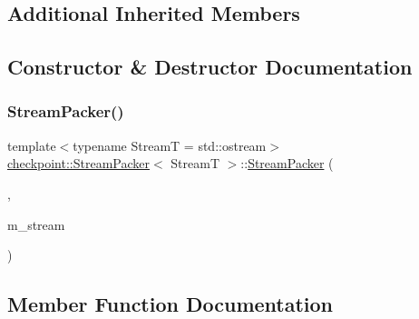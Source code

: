 \subsection*{Additional Inherited Members}


\subsection{Constructor \& Destructor Documentation}
\mbox{\label{structcheckpoint_1_1_stream_packer_a5308ba62ab4031a110c92c37718f7767}} 
\subsubsection{\texorpdfstring{Stream\+Packer()}{StreamPacker()}}
{\footnotesize\ttfamily template$<$typename StreamT  = std\+::ostream$>$ \\
\hyperlink{structcheckpoint_1_1_stream_packer}{checkpoint\+::\+Stream\+Packer}$<$ StreamT $>$\+::\hyperlink{structcheckpoint_1_1_stream_packer}{Stream\+Packer} (\begin{DoxyParamCaption}\item[{\hyperlink{namespacecheckpoint_a083f6674da3f94c2901b18c6d238217c}{Serial\+Size\+Type}}]{,  }\item[{StreamT \&}]{m\+\_\+stream }\end{DoxyParamCaption})\hspace{0.3cm}{\ttfamily [inline]}}



\subsection{Member Function Documentation}
\mbox{\label{structcheckpoint_1_1_stream_packer_a9f089858b3aa248db20827c0cb0b6b40}} 
